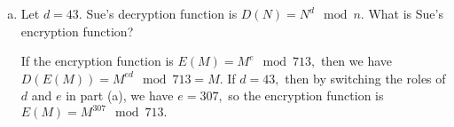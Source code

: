\documentclass{article}
\begin{document}
\begin{itemize}
\begin{enumerate}[(a)]
			\item Let $d=43.$ Sue's decryption function is $D(N)=N^d\mod n.$ What is Sue's encryption function?
				\begin{soln}
					If the encryption function is $E(M)=M^e\mod 713,$ then we have $D(E(M)) = M^{ed}\mod 713 = M.$ If $d=43,$ then by switching the roles of $d$ and $e$ in part (a), we have $e=307,$ so the encryption function is $E(M)=M^{307}\mod 713.$
				\end{soln}
				
		\end{enumerate}
		
\end{itemize}
\end{document}
